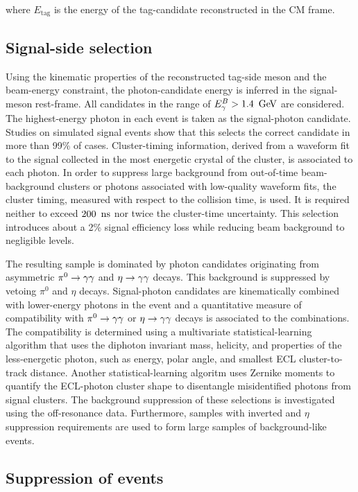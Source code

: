 \noindent where $E_{\mathrm{tag}}$ is the energy of the tag-candidate reconstructed in the CM frame.


\subsection{Signal-side selection}\label{sec:signal_side_reconstruction}

Using the kinematic properties of the reconstructed tag-side meson and the beam-energy constraint, the photon-candidate energy is inferred in the signal-\B meson rest-frame. All candidates in the range of ${E^B_{\gamma}}>1.4~\mathrm{\,Ge\kern -0.1em V}$ are considered. The highest-energy photon in each event is taken as the signal-photon candidate. Studies on simulated signal events show that this selects the correct \BtoXsgamma candidate in more than 99\% of cases. Cluster-timing information, derived from a waveform fit to the signal collected in the most energetic crystal of the cluster, is associated to each photon. In order to suppress large background from out-of-time beam-background clusters or photons associated with low-quality waveform fits, the cluster timing, measured with respect to the collision time, is used. It is required neither to exceed $200~{\rm \,ns}$ nor twice the cluster-time uncertainty. This selection introduces about a 2\% signal efficiency loss while reducing beam background to negligible levels.

The resulting sample is dominated by photon candidates originating from asymmetric $\pi^0\rightarrow\gamma\gamma$ and $\eta\rightarrow\gamma\gamma$ decays. This background is suppressed by vetoing $\pi^0$ and $\eta$ decays. Signal-photon candidates are kinematically combined with lower-energy photons in the event and a quantitative measure of compatibility with $\pi^0\rightarrow\gamma\gamma$ or $\eta\rightarrow\gamma\gamma$ decays is associated to the combinations. The compatibility is determined using a multivariate statistical-learning algorithm that uses the diphoton invariant mass, helicity, and properties of the less-energetic photon, such as energy, polar angle, and smallest ECL cluster-to-track distance. Another statistical-learning algoritm uses Zernike moments to quantify the ECL-photon cluster shape to disentangle misidentified photons from signal clusters. The background suppression of these selections is investigated using the off-resonance data. Furthermore, samples with inverted \piz and $\eta$ suppression requirements are used to form large samples of background-like events.

\subsection{Suppression of \qqbar events}\label{sec:qqbar_selection}

